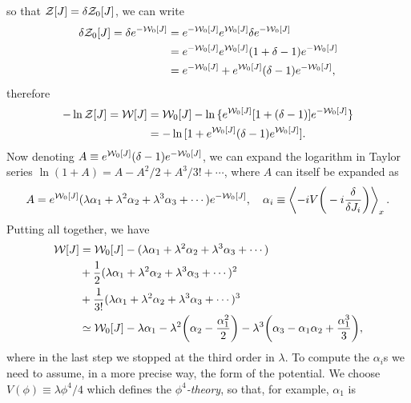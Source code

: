 so that $\mathcal{Z}[J] = \delta \mathcal{Z}_0[J]$, we can write 
\begin{equation}
    \begin{split}
        \delta \mathcal{Z}_0[J] = \delta e^{-\mathcal{W}_0[J]} &= e^{-\mathcal{W}_0[J]}e^{\mathcal{W}_0[J]}\delta e^{-\mathcal{W}_0[J]} \\
        &= e^{-\mathcal{W}_0[J]}e^{\mathcal{W}_0[J]}(1 + \delta - 1)e^{-\mathcal{W}_0[J]} \\
        &= e^{-\mathcal{W}_0[J]} + e^{\mathcal{W}_0[J]}(\delta - 1)e^{-\mathcal{W}_0[J]},
    \end{split}
\end{equation}
therefore
\begin{equation}
    \begin{split}
        -\ln{\mathcal{Z}[J]} = \mathcal{W}[J] &= \mathcal{W}_0[J] - \ln{\{e^{\mathcal{W}_0[J]}[1 + (\delta - 1)]e^{-\mathcal{W}_0[J]}\}} \\
        &= -\ln{[1 + e^{\mathcal{W}_0[J]}(\delta - 1)e^{\mathcal{W}_0[J]}]}.
    \end{split}
\end{equation}
Now denoting $A \equiv e^{\mathcal{W}_0[J]}(\delta - 1)e^{-\mathcal{W}_0[J]}$, we can expand the logarithm in Taylor series $\ln{(1 + A)} = A - A^2/2 + A^3/3! + \cdots$, where $A$ can itself be expanded as 
\begin{equation}
    A = e^{\mathcal{W}_0[J]}(\lambda\alpha_1 + \lambda^2\alpha_2 + \lambda^3 \alpha_3 + \cdots)e^{-\mathcal{W}_0[J]},\quad \alpha_i \equiv \left\langle -iV\bigg(-i\frac{\delta}{\delta J_i}\bigg) \right\rangle_x.
\end{equation}
Putting all together, we have 
\begin{equation}
    \begin{split}
        \mathcal{W}[J] &= \mathcal{W}_0[J] - (\lambda\alpha_1 + \lambda^2\alpha_2 + \lambda^3 \alpha_3 + \cdots) \\
        &+ \frac{1}{2}(\lambda\alpha_1 + \lambda^2\alpha_2 + \lambda^3 \alpha_3 + \cdots)^2 \\
        &+ \frac{1}{3!}(\lambda\alpha_1 + \lambda^2\alpha_2 + \lambda^3 \alpha_3 + \cdots)^3 \\
        &\simeq \mathcal{W}_0[J] - \lambda\alpha_1 - \lambda^2\bigg(\alpha_2 - \frac{\alpha_1^2}{2}\bigg) - \lambda^3\bigg(\alpha_3 - \alpha_1\alpha_2 + \frac{\alpha_1^3}{3}\bigg),
    \end{split}
\end{equation}
where in the last step we stopped at the third order in $\lambda$. To compute the $\alpha_i$s we need to assume, in a more precise way, the form of the potential. We choose $V(\phi) \equiv \lambda\phi^4/4$ which defines the \emph{$\phi^4$-theory}, so that, for example, $\alpha_1$ is 
